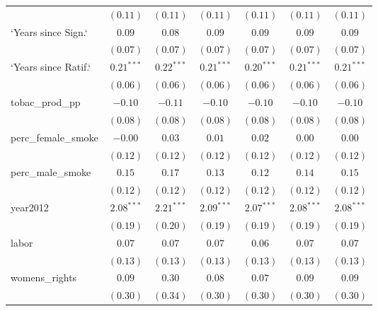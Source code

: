 \begin{table}[!h]
\begin{center}
\begin{tabular}{l c c c c c c }
                        & $(0.11)$     & $(0.11)$     & $(0.11)$     & $(0.11)$     & $(0.11)$     & $(0.11)$     \\
`Years since Sign.`     & $0.09$       & $0.08$       & $0.09$       & $0.09$       & $0.09$       & $0.09$       \\
                        & $(0.07)$     & $(0.07)$     & $(0.07)$     & $(0.07)$     & $(0.07)$     & $(0.07)$     \\
`Years since Ratif.`    & $0.21^{***}$ & $0.22^{***}$ & $0.21^{***}$ & $0.20^{***}$ & $0.21^{***}$ & $0.21^{***}$ \\
                        & $(0.06)$     & $(0.06)$     & $(0.06)$     & $(0.06)$     & $(0.06)$     & $(0.06)$     \\
tobac\_prod\_pp         & $-0.10$      & $-0.11$      & $-0.10$      & $-0.10$      & $-0.10$      & $-0.10$      \\
                        & $(0.08)$     & $(0.08)$     & $(0.08)$     & $(0.08)$     & $(0.08)$     & $(0.08)$     \\
perc\_female\_smoke     & $-0.00$      & $0.03$       & $0.01$       & $0.02$       & $0.00$       & $0.00$       \\
                        & $(0.12)$     & $(0.12)$     & $(0.12)$     & $(0.12)$     & $(0.12)$     & $(0.12)$     \\
perc\_male\_smoke       & $0.15$       & $0.17$       & $0.13$       & $0.12$       & $0.14$       & $0.15$       \\
                        & $(0.12)$     & $(0.12)$     & $(0.12)$     & $(0.12)$     & $(0.12)$     & $(0.12)$     \\
year2012                & $2.08^{***}$ & $2.21^{***}$ & $2.09^{***}$ & $2.07^{***}$ & $2.08^{***}$ & $2.08^{***}$ \\
                        & $(0.19)$     & $(0.20)$     & $(0.19)$     & $(0.19)$     & $(0.19)$     & $(0.19)$     \\
labor                   & $0.07$       & $0.07$       & $0.07$       & $0.06$       & $0.07$       & $0.07$       \\
                        & $(0.13)$     & $(0.13)$     & $(0.13)$     & $(0.13)$     & $(0.13)$     & $(0.13)$     \\
womens\_rights          & $0.09$       & $0.30$       & $0.08$       & $0.07$       & $0.09$       & $0.09$       \\
                        & $(0.30)$     & $(0.34)$     & $(0.30)$     & $(0.30)$     & $(0.30)$     & $(0.30)$     \\

\end{tabular}
\end{center}
\end{table}
